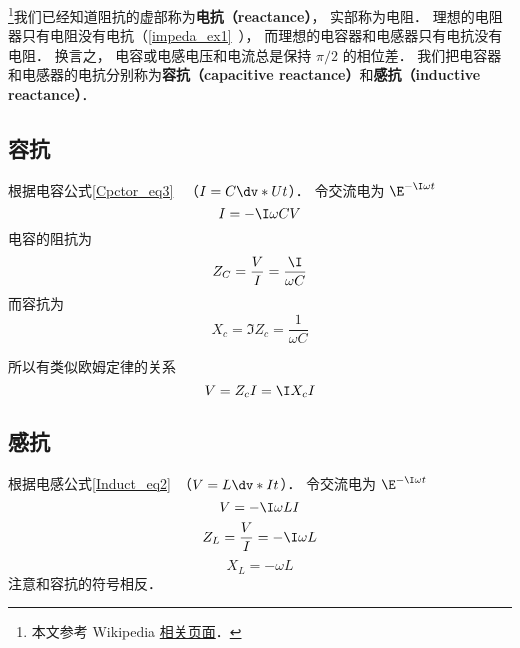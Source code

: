 
\begin{issues}
\issueDraft
\end{issues}


\footnote{本文参考 Wikipedia \href{https://en.wikipedia.org/wiki/Electrical_reactance}{相关页面}．}我们已经知道阻抗的虚部称为\textbf{电抗（reactance）}， 实部称为电阻． 理想的电阻器只有电阻没有电抗（\autoref{impeda_ex1}~）， 而理想的电容器和电感器只有电抗没有电阻． 换言之， 电容或电感电压和电流总是保持 $\pi/2$ 的相位差． 我们把电容器和电感器的电抗分别称为\textbf{容抗（capacitive reactance）}和\textbf{感抗（inductive reactance）}．

\subsection{容抗}
根据电容公式\autoref{Cpctor_eq3}~ （$I = C\dv*{U}{t}$）． 令交流电为 $\E^{-\I \omega t}$
\begin{equation}
I = -\I \omega CV
\end{equation}
电容的阻抗为
\begin{equation}
Z_C = \frac{V}{I} = \frac{\I}{\omega C}
\end{equation}
而容抗为
\begin{equation}
X_c = \Im{Z_c} = \frac{1}{\omega C}
\end{equation}

所以有类似欧姆定律的关系
\begin{equation}
V = Z_c I = \I X_c I
\end{equation}

\subsection{感抗}
根据电感公式\autoref{Induct_eq2}~（$V = L\dv*{I}{t}$）． 令交流电为 $\E^{-\I \omega t}$
\begin{equation}
V = -\I\omega L I
\end{equation}
\begin{equation}
Z_L = \frac{V}{I} = -\I\omega L
\end{equation}
\begin{equation}
X_L = -\omega L
\end{equation}
注意和容抗的符号相反．
